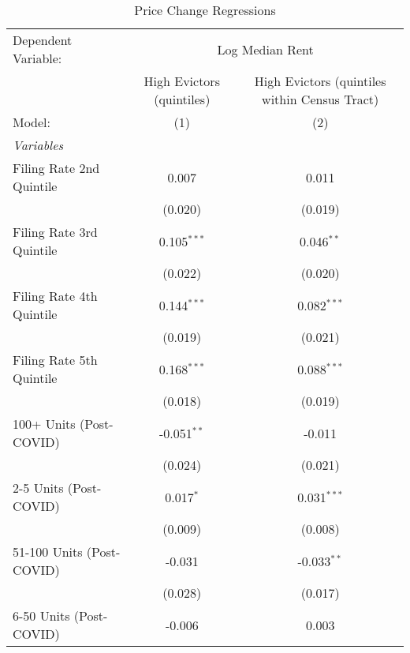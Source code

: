 \begin{table}[htbp]
   \caption{Price Change Regressions}
   \centering
   \begin{tabular}{lcc}
      \tabularnewline \midrule \midrule
      Dependent Variable: & \multicolumn{2}{c}{Log Median Rent}\\
                                                  & High Evictors (quintiles) & High Evictors (quintiles within Census Tract) \\   
      Model:                                      & (1)                       & (2)\\  
      \midrule
      \emph{Variables}\\
      Filing Rate 2nd Quintile                    & 0.007                     & 0.011\\   
                                                  & (0.020)                   & (0.019)\\   
      Filing Rate 3rd Quintile                    & 0.105$^{***}$             & 0.046$^{**}$\\   
                                                  & (0.022)                   & (0.020)\\   
      Filing Rate 4th Quintile                    & 0.144$^{***}$             & 0.082$^{***}$\\   
                                                  & (0.019)                   & (0.021)\\   
      Filing Rate 5th Quintile                    & 0.168$^{***}$             & 0.088$^{***}$\\   
                                                  & (0.018)                   & (0.019)\\   
      100+ Units (Post-COVID)                     & -0.051$^{**}$             & -0.011\\   
                                                  & (0.024)                   & (0.021)\\   
      2-5 Units (Post-COVID)                      & 0.017$^{*}$               & 0.031$^{***}$\\   
                                                  & (0.009)                   & (0.008)\\   
      51-100 Units (Post-COVID)                   & -0.031                    & -0.033$^{**}$\\   
                                                  & (0.028)                   & (0.017)\\   
      6-50 Units (Post-COVID)                     & -0.006                    & 0.003\\   

\end{tabular}
\end{table}

